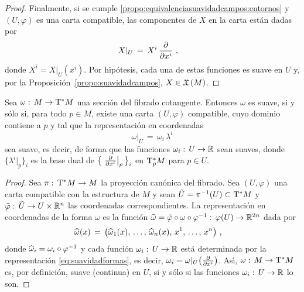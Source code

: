\begin{proof}
	Finalmente, si se cumple
	\ref{propo:equivalenciasuavidadcampos:entornos} y $(U,\varphi)$ es una
	carta compatible, las componentes de $X$ en la carta est\'{a}n dadas
	por
	\begin{align*}
		X|_U & \,=\, X^i\,\gancho{x^i}
		\text{ ,}
	\end{align*}
	donde $X^i=X|_U(x^i)$. Por hip\'{o}tesis, cada una de estas funciones
	es suave en $U$ y, por la Proposici\'{o}n~\ref{propo:suavidadcampos},
	$X\in\mathfrak{X}\left(M\right)$.
\end{proof}

\begin{propoSuavidadFormas}\label{propo:suavidadformas}
	Sea $\omega:\,M\rightarrow\tangente*{M}$ una secci\'{o}n del fibrado
	cotangente. Entonces $\omega$ es suave, si y s\'{o}lo si, para todo
	$p\in M$, existe una carta $(U,\varphi)$ compatible, cuyo dominio
	contiene a $p$ y tal que la representaci\'{o}n en coordenadas
	\begin{equation}\label{eq:suavidadformas}
		\omega|_U \,=\,\omega_i\,\lambda^i
	\end{equation}
	sea suave, es decir, de forma que las funciones
	$\omega_i:\,U\rightarrow\mathbb{R}$ sean suaves, donde
	$\big\{\lambda^i|_p\big\}_i$ es la base dual de
	$\big\{\gancho[p]{x^i}\big\}_i$ en $\tangente*[p]{M}$ para $p\in U$.
\end{propoSuavidadFormas}

\begin{proof}
	Sea $\pi:\,\tangente*{M}\rightarrow M$ la proyecci\'{o}n can\'{o}nica
	del fibrado. Sea $(U,\varphi)$ una carta compatible con la estructura
	de $M$ y sean $\delfibrado{U}=\pi^{-1}(U)\subset\tangente*{M}$ y
	$\tilde{\varphi}:\,\tilde{U}\rightarrow U\times\mathbb{R}^n$ las
	coordenadas correspondientes. La representaci\'{o}n en coordenadas de
	la forma $\omega$ es la funci\'{o}n
	\begin{math}
		\widehat{\omega}=
			\tilde{\varphi}\circ\omega\circ\varphi^{-1}:\,
			\varphi(U)\rightarrow\mathbb{R}^{2n}
	\end{math} dada por
	\begin{align*}
		\encoordenadas{\omega}(x) & \,=\,\big(
			\encoordenadas{\omega}_1(x),\,\dots,\,
			\encoordenadas{\omega}_n(x),\,\lista*{x}{n}\big)
		\text{ ,}
	\end{align*}
	donde $\widehat{\omega}_i=\omega_i\circ\varphi^{-1}$ y cada
	funci\'{o}n $\omega_i:\,U\rightarrow\mathbb{R}$ est\'{a} determinada por la
	representaci\'{o}n \eqref{eq:suavidadformas}, es decir,
	$\omega_i=\omega|_U\big(\gancho{x^i}\big)$. As\'{\i},
	$\omega:\,M\rightarrow\tangente*{M}$ es, por definici\'{o}n, suave
	(continua) en $U$, si y s\'{o}lo si las funciones
	$\omega_i:\,U\rightarrow\mathbb{R}$ lo son.
\end{proof}


